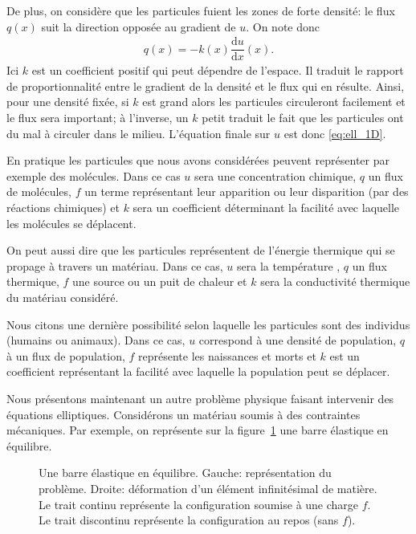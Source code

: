 \documentclass[12pt,a4paper,twoside]{article}
\begin{document}
De plus, on consid\`ere que les particules fuient les zones de forte densit\'e:
le flux $q(x)$ suit la direction oppos\'ee au gradient de $u$.
On note donc 
\begin{align}
  \label{eq:def_flux}
  q(x) = - k(x) \dfrac{\mathrm{d} u}{\mathrm{d} x}(x) . 
\end{align}
Ici $k$ est un coefficient positif qui peut d\'ependre de l'espace.
Il traduit le rapport de proportionnalit\'e entre le gradient de la densit\'e
et le flux qui en r\'esulte. Ainsi, pour une densit\'e fix\'ee,
si $k$ est grand alors les particules circuleront facilement et le flux sera important;
\`a l'inverse, un $k$ petit traduit le fait que les particules ont du mal \`a circuler dans
le milieu.
L'\'equation finale sur $u$ est donc \eqref{eq:ell_1D}.



En pratique les particules que nous avons consid\'er\'ees peuvent 
repr\'esenter par exemple des mol\'ecules.
Dans ce cas $u$ sera une concentration chimique, $q$ un flux de mol\'ecules, 
$f$ un terme repr\'esentant leur apparition ou leur disparition
(par des r\'eactions chimiques) et
$k$ sera un coefficient d\'eterminant la facilit\'e avec laquelle
les mol\'ecules se d\'eplacent.

On peut aussi dire que les particules repr\'esentent de l'\'energie thermique
qui se propage \`a travers un mat\'eriau.
Dans ce cas, $u$ sera la temp\'erature , $q$ un flux thermique, $f$ une source
ou un puit de chaleur et $k$ sera la conductivit\'e thermique du mat\'eriau consid\'er\'e.

Nous citons une derni\`ere possibilit\'e selon laquelle les particules sont des
individus (humains ou animaux).
Dans ce cas, $u$ correspond \`a une densit\'e de population,
$q$ \`a un flux de population, $f$ repr\'esente les naissances et morts
et $k$ est un coefficient repr\'esentant la
facilit\'e avec laquelle la population peut se d\'eplacer. 


Nous pr\'esentons maintenant
un autre probl\`eme physique faisant intervenir des \'equations elliptiques.
Consid\'erons un mat\'eriau 
soumis \`a des contraintes m\'ecaniques.
Par exemple, on repr\'esente sur la figure~\ref{fig:barre} une barre \'elastique
en \'equilibre.


\begin{figure}
\begin{tikzpicture}[scale = 1.5]
  
\end{tikzpicture}
\begin{tikzpicture}[scale = 2]
  
\end{tikzpicture}
\caption{Une barre \'elastique en \'equilibre. Gauche: repr\'esentation du probl\`eme.
  Droite: d\'eformation d'un \'el\'ement infinit\'esimal de mati\`ere.
  Le trait continu repr\'esente la configuration soumise \`a une charge $f$.
  Le trait discontinu repr\'esente la configuration au repos (sans $f$).}
\label{fig:barre}
\end{figure}
\end{document}
